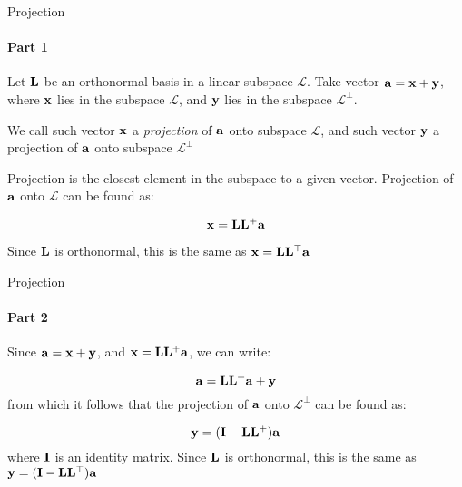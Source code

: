 \documentclass{beamer}
\begin{document}
\begin{frame}{Projection}
	\framesubtitle{Part 1}
	\begin{flushleft}
		
		Let $\mathbf{L}$ be an orthonormal basis in a linear subspace $\mathcal{L}$. Take vector $\mathbf{a} = \mathbf{x} + \mathbf{y}$, where $\mathbf{x}$ lies in the subspace $\mathcal{L}$, and $\mathbf{y}$ lies in the subspace $\mathcal{L}^\perp$.
		
		\bigskip
		
		\begin{definition}
			We call such vector $\mathbf{x}$ a \emph{projection} of $\mathbf{a}$ onto subspace $\mathcal{L}$, and such vector $\mathbf{y}$ a projection of $\mathbf{a}$ onto subspace $\mathcal{L}^\perp$
		\end{definition}
		
		\bigskip
		
		Projection is the closest element in the subspace to a given vector. Projection of $\mathbf{a}$ onto $\mathcal{L}$ can be found as: 
		
		\begin{equation}
			\mathbf{x} = \mathbf{L} \mathbf{L}^+ \mathbf{a}
		\end{equation}
		
		Since $\mathbf{L}$ is orthonormal, this is the same as $\mathbf{x} = \mathbf{L} \mathbf{L}^\top \mathbf{a}$
		
	\end{flushleft}
\end{frame}



\begin{frame}{Projection}
	\framesubtitle{Part 2}
	\begin{flushleft}
		
		Since $\mathbf{a} = \mathbf{x} + \mathbf{y}$, and $\mathbf{x} = \mathbf{L} \mathbf{L}^+ \mathbf{a}$, we can write:
		
		\begin{equation}
			\mathbf{a} = \mathbf{L} \mathbf{L}^+ \mathbf{a} + \mathbf{y}
		\end{equation}
		from which it follows that the projection of $\mathbf{a}$ onto $\mathcal{L}^\perp$ can be found as: 
		
		\begin{equation}
			\mathbf{y} = (\mathbf{I} - \mathbf{L} \mathbf{L}^+) \mathbf{a}
		\end{equation}
		where $\mathbf{I}$ is an identity matrix. Since $\mathbf{L}$ is orthonormal, this is the same as $\mathbf{y} = (\mathbf{I} - \mathbf{L} \mathbf{L}^\top) \mathbf{a}$
		
	\end{flushleft}
\end{frame}
\end{document}
